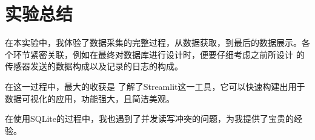 \section{实验总结}
在本实验中，我体验了数据采集的完整过程，从数据获取，到最后的数据展示。各个环节紧密关联，例如在最终对数据库进行设计时，便要仔细考虑之前所设计
的传感器发送的数据构成以及记录的日志的构成。

在这一过程中，最大的收获是
了解了Streamlit这一工具，它可以快速构建出用于数据可视化的应用，功能强大，且简洁美观。

在使用SQLite的过程中，我也遇到了并发读写冲突的问题，为我提供了宝贵的经验。